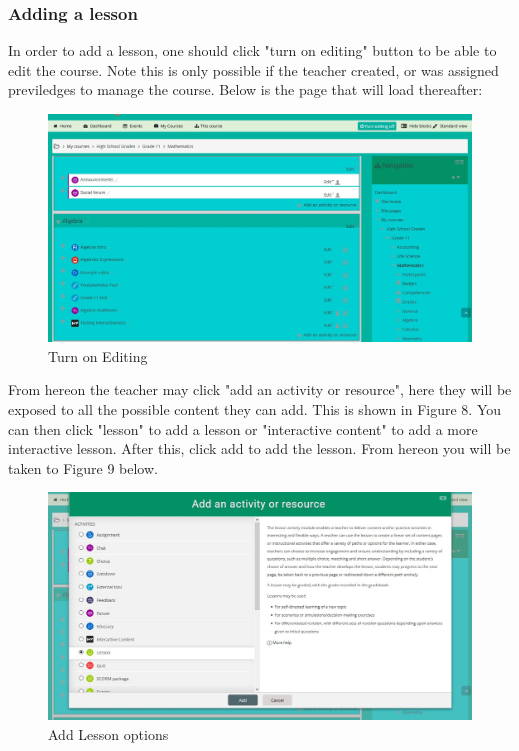 \documentclass[12pt,a4paper]{article}
\begin{document}
		\subsubsection{Adding a lesson}
			In order to add a lesson, one should click "turn on editing" button to be able to edit the course. Note this is only possible if the teacher created, or was assigned previledges to manage the course. Below is the page that will load thereafter:
		 
			\begin{figure}[h]
			 	\centering
			 	\includegraphics[width=1\textwidth]{images/editCourse.JPG}
			 	\caption{Turn on Editing}
			 	\label{Figure 7}
			 \end{figure}
	 		From hereon the teacher may click "add an activity or resource", here they will be exposed to all the possible content they can add. This is shown in Figure 8. You can then click "lesson" to add a lesson or "interactive content" to add a more interactive lesson. After this, click add to add the lesson. From hereon you will be taken to Figure 9 below.
	 	
	 		\begin{figure}[h]
	 			\centering
	 			\includegraphics[width=1\textwidth]{images/addLesson.JPG}
	 			\caption{Add Lesson options}
	 			\label{Figure 8}
	 		\end{figure}
		 
\end{document}
